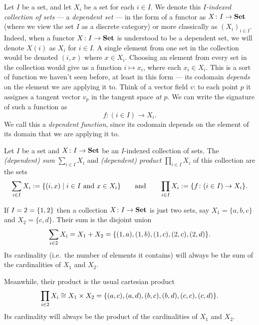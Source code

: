 \documentclass[Book-Poly]{subfiles}
\begin{document}
Let $I$ be a set, and let $X_i$ be a set for each $i\in I$. We denote this
\emph{$I$-indexed collection of sets} --- a \emph{dependent set} --- in the form of a functor as $X\colon I\to\mathbf{Set}$ (where we view the set $I$ as a discrete category) or more classically as $(X_i)_{i\in I}$.
Indeed, when a functor $X \colon I \to \mathbf{Set}$ is understood to be a dependent set, we will denote $X(i)$ as $X_i$ for $i \in I$.
A single element from one set in the collection would be denoted $(i,x)$ where $x\in X_i$. Choosing an element from
every set in the collection would give us a function $i \mapsto x_i$, where each
$x_i\in X_i$. This is a sort of function we haven't seen before, at least in
this form --- its codomain \emph{depends} on the element we are applying it to.
Think of a vector field $v$: to each point $p$ it assignes a tangent vector
$v_p$ in the tangent space \emph{at $p$}. We can write the signature of such a
function as
\[f \colon (i \in I) \to X_i.\]
We call this a \emph{dependent function}, since its codomain depends on the element of its domain that we are applying it to.

\begin{definition} \label{def.dep_sums_prods_sets}
Let $I$ be a set and $X\colon I\to\mathbf{Set}$ be an $I$-indexed collection of sets. The \emph{(dependent) sum} $\sum_{i\in I}X_i$ and \emph{(dependent) product} $\prod_{i\in I}X_i$ of this collection are the sets
\[
\sum_{i\in I}X_i:=\{(i,x)\mid i\in I\text{ and }x\in X_i\}
\qquad\text{and}\qquad
\prod_{i\in I}X_i:=\{f \colon (i \in I) \to X_i\}.
\]
\end{definition}

\begin{example}\label{ex.two_sums_and_prods}
If $I=\textsf{2}=\{1,2\}$ then a collection $X\colon I\to \mathbf{Set}$ is just two sets, say $X_1=\{a,b,c\}$ and $X_2=\{c,d\}$. Their sum is the disjoint union
\[\sum_{i\in \textsf{2}}X_i=X_1+X_2=\{(1,a),(1,b),(1,c),(2,c),(2,d)\}.\]
Its cardinality (i.e.\ the number of elements it contains) will always be the sum of the cardinalities of $X_1$ and $X_2$.

Meanwhile, their product is the usual cartesian product
\[\prod_{i\in \textsf{2}}X_i \cong X_1\times X_2=\{(a,c),(a,d),(b,c),(b,d),(c,c),(c,d)\}.\]
Its cardinality will always be the product of the cardinalities of $X_1$ and $X_2$.
\end{example}
\end{document}
